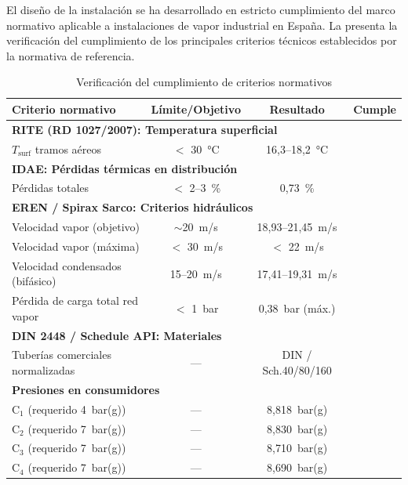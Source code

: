 El diseño de la instalación se ha desarrollado en estricto cumplimiento del marco normativo aplicable a instalaciones de vapor industrial en España. La  presenta la verificación del cumplimiento de los principales criterios técnicos establecidos por la normativa de referencia.

\begin{table}[H]
	\centering
	\caption{Verificación del cumplimiento de criterios normativos}
	\label{tab:conclusiones-cumplimiento-normativo}
	\begin{tabular}{p{5cm}ccc}
		\toprule
		\textbf{Criterio normativo}       & \textbf{Límite/Objetivo} & \textbf{Resultado}  & \textbf{Cumple} \\
		\midrule
		\multicolumn{4}{l}{\textbf{RITE (RD 1027/2007): Temperatura superficial}}                            \\
		$T_{\text{surf}}$ tramos aéreos   & $<$ 30~°C                & 16,3--18,2~°C       & \checkmark      \\
		\midrule
		\multicolumn{4}{l}{\textbf{IDAE: Pérdidas térmicas en distribución}}                                 \\
		Pérdidas totales                  & $<$ 2--3~\%              & 0,73~\%             & \checkmark      \\
		\midrule
		\multicolumn{4}{l}{\textbf{EREN / Spirax Sarco: Criterios hidráulicos}}                              \\
		Velocidad vapor (objetivo)        & $\sim$20~m/s             & 18,93--21,45~m/s    & \checkmark      \\
		Velocidad vapor (máxima)          & $<$ 30~m/s               & $<$ 22~m/s          & \checkmark      \\
		Velocidad condensados (bifásico)  & 15--20~m/s               & 17,41--19,31~m/s    & \checkmark      \\
		Pérdida de carga total red vapor  & $<$ 1~bar                & 0,38~bar (máx.)     & \checkmark      \\
		\midrule
		\multicolumn{4}{l}{\textbf{DIN 2448 / Schedule API: Materiales}}                                     \\
		Tuberías comerciales normalizadas & ---                      & DIN / Sch.40/80/160 & \checkmark      \\
		\midrule
		\multicolumn{4}{l}{\textbf{Presiones en consumidores}}                                               \\
		C$_1$ (requerido 4~bar(g))        & ---                      & 8,818~bar(g)        & \checkmark      \\
		C$_2$ (requerido 7~bar(g))        & ---                      & 8,830~bar(g)        & \checkmark      \\
		C$_3$ (requerido 7~bar(g))        & ---                      & 8,710~bar(g)        & \checkmark      \\
		C$_4$ (requerido 7~bar(g))        & ---                      & 8,690~bar(g)        & \checkmark      \\
		\bottomrule
	\end{tabular}
\end{table}


